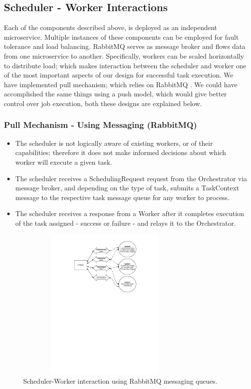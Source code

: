\documentclass[sigconf]{acmart}
\begin{document}
\subsection {Scheduler - Worker Interactions}
Each of the components described above, is deployed as an independent microservice. Multiple instances of these components can be employed for fault tolerance and load balancing. RabbitMQ serves as message broker and flows data from one microservice to another. Specifically, workers can be scaled horizontally to distribute load; which makes interaction between the scheduler and worker one of the most important aspects of our design for successful task execution. We have implemented pull mechanism; which relies on RabbitMQ \cite{sadooghi2014achieving}. We could have accomplished the same things using a push model, which would give better control over job execution, both these designs are explained below.

\subsubsection{Pull Mechanism - Using Messaging (RabbitMQ)}
\begin{itemize}
\item The scheduler is not logically aware of existing workers, or of their capabilities; therefore it does not make informed decisions about which worker will execute a given task.
\item The scheduler receives a SchedulingRequest request from the Orchestrator via message broker, and depending on the type of task, submits a TaskContext message to the respective task message queue for any worker to process.
\item The scheduler receives a response from a Worker after it completes execution of the task assigned - success or failure - and relays it to the Orchestrator.
\end{itemize}

\begin{figure}
\includegraphics[height=3in, width=3.5in]{figures/scheduler-pull-mechanism.pdf}
\caption{Scheduler-Worker interaction using RabbitMQ messaging queues.}
\end{figure}
\end{document}

